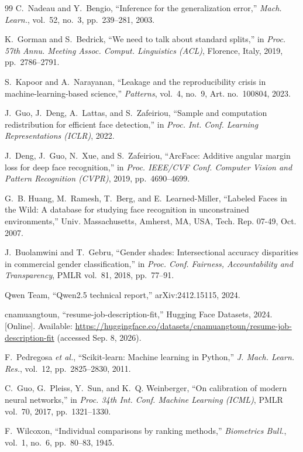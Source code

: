 \documentclass[conference,a4paper]{IEEEtran}
\begin{document}
\begin{thebibliography}{99}
C.~Nadeau and Y.~Bengio, ``Inference for the generalization error,''
\emph{Mach. Learn.}, vol.~52, no.~3, pp.~239--281, 2003.

K.~Gorman and S.~Bedrick, ``We need to talk about standard splits,'' in
\emph{Proc. 57th Annu. Meeting Assoc. Comput. Linguistics (ACL)}, Florence,
Italy, 2019, pp.~2786--2791.

S.~Kapoor and A.~Narayanan, ``Leakage and the reproducibility crisis in
machine-learning-based science,'' \emph{Patterns}, vol.~4, no.~9, Art.
no.~100804, 2023.

J.~Guo, J.~Deng, A.~Lattas, and S.~Zafeiriou, ``Sample and computation
redistribution for efficient face detection,'' in \emph{Proc. Int. Conf.
Learning Representations (ICLR)}, 2022.

J.~Deng, J.~Guo, N.~Xue, and S.~Zafeiriou, ``ArcFace: Additive angular margin
loss for deep face recognition,'' in \emph{Proc. IEEE/CVF Conf. Computer
Vision and Pattern Recognition (CVPR)}, 2019, pp.~4690--4699.

G.~B. Huang, M.~Ramesh, T.~Berg, and E.~Learned-Miller, ``Labeled Faces in the
Wild: A database for studying face recognition in unconstrained
environments,'' Univ. Massachusetts, Amherst, MA, USA, Tech. Rep. 07-49,
Oct. 2007.

J.~Buolamwini and T.~Gebru, ``Gender shades: Intersectional accuracy
disparities in commercial gender classification,'' in \emph{Proc. Conf.
Fairness, Accountability and Transparency}, PMLR vol.~81, 2018, pp.~77--91.

Qwen Team, ``Qwen2.5 technical report,'' arXiv:2412.15115, 2024.

cnamuangtoun, ``resume-job-description-fit,'' Hugging Face Datasets, 2024.
[Online]. Available:
\url{https://huggingface.co/datasets/cnamuangtoun/resume-job-description-fit}
(accessed Sep. 8, 2026).

F.~Pedregosa \emph{et al.}, ``Scikit-learn: Machine learning in Python,''
\emph{J. Mach. Learn. Res.}, vol.~12, pp.~2825--2830, 2011.

C.~Guo, G.~Pleiss, Y.~Sun, and K.~Q. Weinberger, ``On calibration of modern
neural networks,'' in \emph{Proc. 34th Int. Conf. Machine Learning (ICML)},
PMLR vol.~70, 2017, pp.~1321--1330.

F.~Wilcoxon, ``Individual comparisons by ranking methods,'' \emph{Biometrics
Bull.}, vol.~1, no.~6, pp.~80--83, 1945.


\end{thebibliography}
\end{document}
